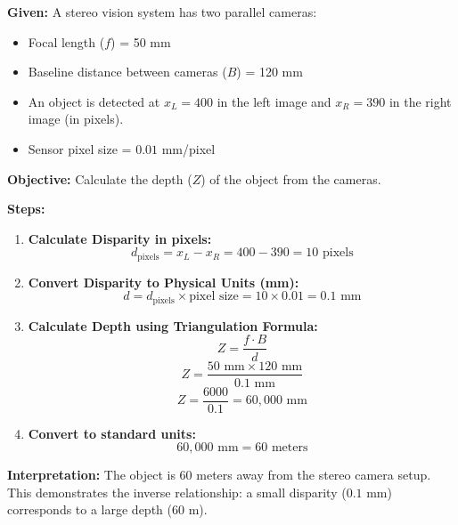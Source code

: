 \documentclass[11pt,a4paper]{article}
\begin{document}
\begin{tcolorbox}[colback=orange!5!white,colframe=orange!75!black,title=\textbf{Numerical 2: Depth Estimation using Stereo Vision}]
\textbf{Given:}
A stereo vision system has two parallel cameras:
\begin{itemize}
    \item Focal length ($f$) = 50 mm
    \item Baseline distance between cameras ($B$) = 120 mm
    \item An object is detected at $x_L = 400$ in the left image and $x_R = 390$ in the right image (in pixels).
    \item Sensor pixel size = $0.01$ mm/pixel
\end{itemize}

\textbf{Objective:} Calculate the depth ($Z$) of the object from the cameras.

\textbf{Steps:}
\begin{enumerate}
    \item \textbf{Calculate Disparity in pixels:}
    \[ d_{\text{pixels}} = x_L - x_R = 400 - 390 = 10 \text{ pixels} \]
    \item \textbf{Convert Disparity to Physical Units (mm):}
    \[ d = d_{\text{pixels}} \times \text{pixel size} = 10 \times 0.01 = 0.1 \text{ mm} \]
    \item \textbf{Calculate Depth using Triangulation Formula:}
    \[ Z = \frac{f \cdot B}{d} \]
    \[ Z = \frac{50 \text{ mm} \times 120 \text{ mm}}{0.1 \text{ mm}} \]
    \[ Z = \frac{6000}{0.1} = 60,000 \text{ mm} \]
    \item \textbf{Convert to standard units:}
    \[ 60,000 \text{ mm} = 60 \text{ meters} \]
\end{enumerate}

\textbf{Interpretation:} The object is 60 meters away from the stereo camera setup. This demonstrates the inverse relationship: a small disparity ($0.1$ mm) corresponds to a large depth ($60$ m).
\end{tcolorbox}
\end{document}
